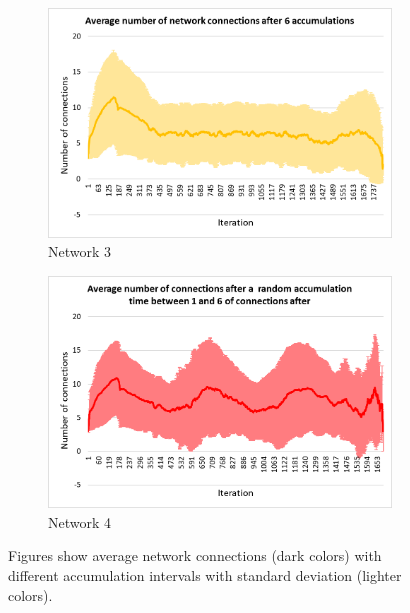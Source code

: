 \documentclass[USenglish]{uit-thesis}
\begin{document}
\begin{figure} [ht]
\begin{subfigure}[b]{0.475\textwidth}
            \includegraphics[width=\textwidth]{numConn_stdev_6.png}
            \caption[]%
            {{\small Network 3}}    
            \label{fig:connfig3}
        \end{subfigure}
        \quad
        \begin{subfigure}[b]{0.475\textwidth}   
            \centering 
            \includegraphics[width=\textwidth]{numConn_stdev_rand.png}
            \caption[]%
            {{\small Network 4}}    
            \label{fig:connfig4}
        \end{subfigure}
        \caption[Figures show average network connections with different accumulation intervals with standard deviation (lighter colors).]
        {\small Figures show average network connections (dark colors) with different accumulation intervals with standard deviation (lighter colors).} 
        \label{fig:netconnChart}
    \end{figure}
    
\end{document}
